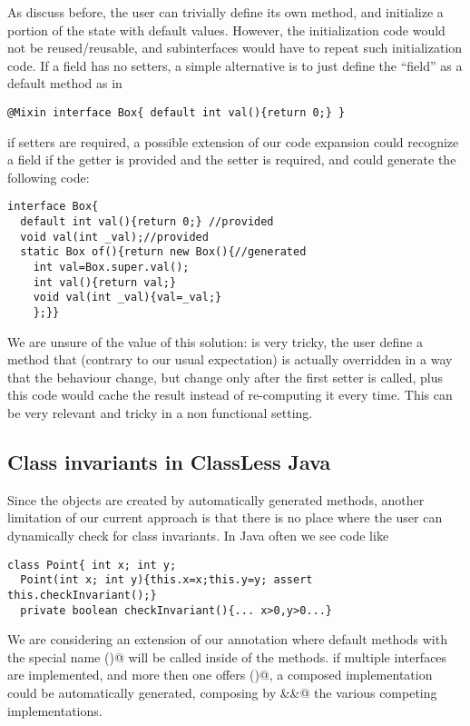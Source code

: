 As discuss before, the user can trivially define its own \Q@of@ method, and initialize a portion of the state with default values.
However, the initialization code would not be reused/reusable, and subinterfaces would have to repeat such initialization code.
If a field has no setters, a simple alternative is to just define the ``field'' as a default method as in 
\begin{lstlisting}
@Mixin interface Box{ default int val(){return 0;} }
\end{lstlisting}
if setters are required, a possible extension of our code expansion could recognize a field if the getter is provided and the setter is required, and could generate the following code:
\begin{lstlisting}
interface Box{ 
  default int val(){return 0;} //provided
  void val(int _val);//provided
  static Box of(){return new Box(){//generated
    int val=Box.super.val();
    int val(){return val;}
    void val(int _val){val=_val;}
    };}}
\end{lstlisting}
We are unsure of the value of this solution: is very tricky, the user define a method that (contrary to our usual expectation) is actually overridden in a way that the behaviour change, but change only after the first setter is called, plus this code would cache the result instead of re-computing it every time. This can be very relevant and tricky in a non functional setting.

\subsection{Class invariants in ClassLess Java}
Since the objects are created by automatically generated methods,
another limitation of our current approach is that there is no place where the user can dynamically check for class invariants.
In Java often we see code like
\begin{lstlisting}
class Point{ int x; int y;
  Point(int x; int y){this.x=x;this.y=y; assert this.checkInvariant();}
  private boolean checkInvariant(){... x>0,y>0...}
\end{lstlisting} 

We are considering an extension of our annotation where 
default methods with the special name \Q@checkInvariant()@ will be called inside of the \Q@of@ methods.
if multiple interfaces are implemented, and more then one offers
\Q@checkInvariant()@,  a composed implementation could be automatically generated, composing by \Q@&&@ the various competing implementations.

